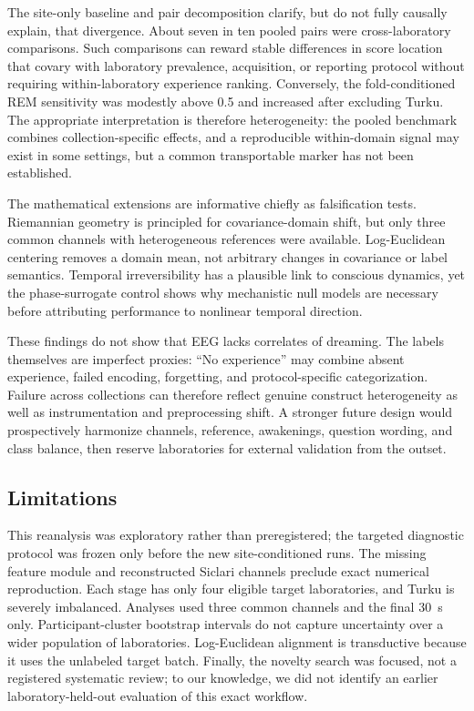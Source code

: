 \documentclass[10pt,twocolumn]{article}
\begin{document}
The site-only baseline and pair decomposition clarify, but do not fully
causally explain, that divergence. About seven in ten pooled pairs were
cross-laboratory comparisons. Such comparisons can reward stable differences
in score location that covary with laboratory prevalence, acquisition, or
reporting protocol without requiring within-laboratory experience ranking.
Conversely, the fold-conditioned REM sensitivity was modestly above 0.5 and
increased after excluding Turku. The appropriate interpretation is therefore
heterogeneity: the pooled benchmark combines collection-specific effects, and
a reproducible within-domain signal may exist in some settings, but a common
transportable marker has not been established.

The mathematical extensions are informative chiefly as falsification tests.
Riemannian geometry is principled for covariance-domain shift, but only three
common channels with heterogeneous references were available. Log-Euclidean
centering removes a domain mean, not arbitrary changes in covariance or label
semantics. Temporal irreversibility has a plausible link to conscious dynamics,
yet the phase-surrogate control shows why mechanistic null models are necessary
before attributing performance to nonlinear temporal direction.

These findings do not show that EEG lacks correlates of dreaming. The labels
themselves are imperfect proxies: ``No experience'' may combine absent
experience, failed encoding, forgetting, and protocol-specific categorization.
Failure across collections can therefore reflect genuine construct
heterogeneity as well as instrumentation and preprocessing shift. A stronger
future design would prospectively harmonize channels, reference, awakenings,
question wording, and class balance, then reserve laboratories for external
validation from the outset.

\subsection{Limitations}

This reanalysis was exploratory rather than preregistered; the targeted
diagnostic protocol was frozen only before the new site-conditioned runs. The
missing feature module and reconstructed Siclari channels preclude exact
numerical reproduction. Each stage has only four eligible target laboratories,
and Turku is severely imbalanced. Analyses used three common channels and the
final 30~s only. Participant-cluster bootstrap intervals do not capture
uncertainty over a wider population of laboratories. Log-Euclidean alignment
is transductive because it uses the unlabeled target batch. Finally, the
novelty search was focused, not a registered systematic review; to our
knowledge, we did not identify an earlier laboratory-held-out evaluation of
this exact workflow.
\end{document}
